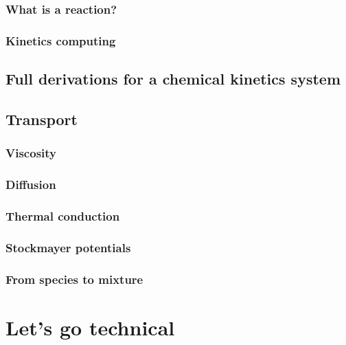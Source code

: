 \documentclass{documentation}
\begin{document}
\subsection{What is a reaction?}
\label{kinetics_gen}


\subsection{Kinetics computing}
\label{kinetics_comput}


\section{Full derivations for a chemical kinetics system}
\label{derivations}


\section{Transport}
\label{transport}

\subsection{Viscosity}
\label{transport:viscosity}


\subsection{Diffusion}
\label{transport:diffusion}


\subsection{Thermal conduction}
\label{transport:thermal}


\subsection{Stockmayer potentials}
\label{transport:Stockmayer}


\subsection{From species to mixture}
\label{transport:speci_to_mixture}


\chapter{Let's go technical}
\chaptermark{\ANTIOCHTech}
\label{Antioch:technique}
\end{document}

